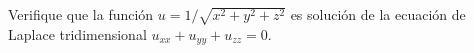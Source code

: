 \item Verifique que la función $u = 1/\sqrt{x^2+y^2+z^2}$ es solución de la ecuación de Laplace tridimensional $u_{xx} + u_{yy} + u_{zz} = 0$.
